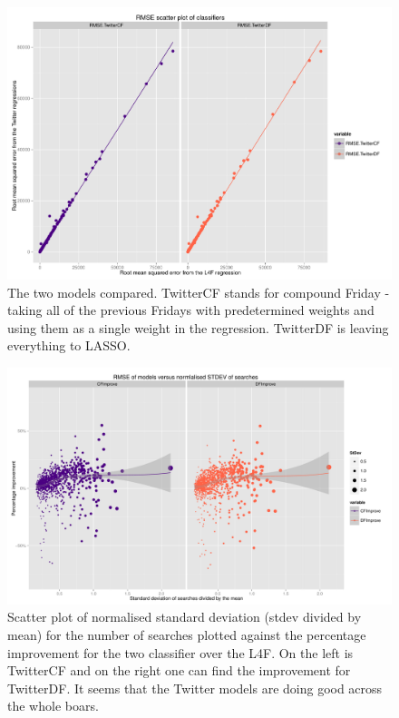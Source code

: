 \documentclass[minf,frontabs,twoside,singlespacing,parskip]{infthesis}
\begin{document}
\begin{figure}[h!]
\begin{center}
\includegraphics[scale=0.4]{rmse_scatter_by_reg}
\end{center}
\caption{The two models compared. TwitterCF stands for compound Friday - taking all of the previous Fridays with predetermined weights and using them as a single weight in the regression. TwitterDF is leaving everything to LASSO.}
\label{rmse_scatter_by_reg}
\end{figure}



\begin{figure}[]
\begin{center}
\includegraphics[scale=0.5]{rmse-nstdev}
\end{center}
\caption{Scatter plot of normalised standard deviation (stdev divided by mean) for the number of searches plotted against the percentage improvement for the two classifier over the L4F. On the left is TwitterCF and on the right one can find the improvement for TwitterDF. It seems that the Twitter models are doing good across the whole boars. }
\label{rmse-nstdev}
\end{figure}
\end{document}

